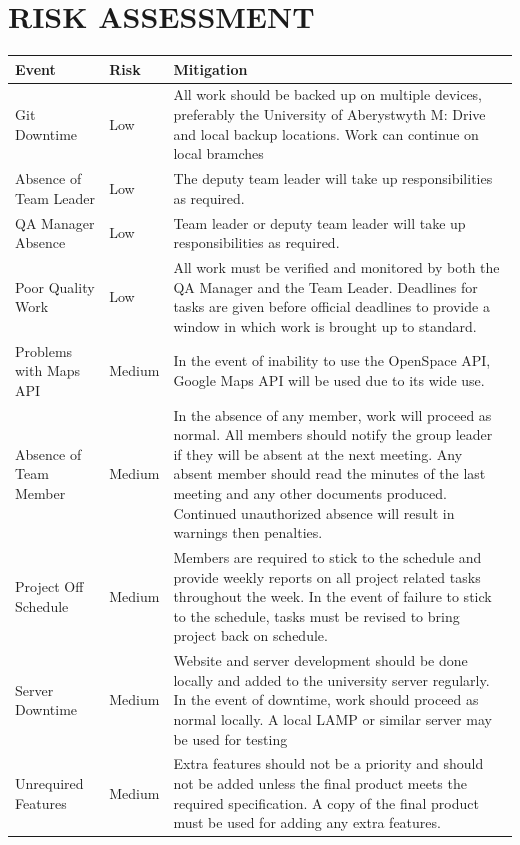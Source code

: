 \documentclass[12pt]{article}
\begin{document}
\section{RISK ASSESSMENT}
\begin{longtable}{|p{2.5cm}|p{1.5cm}|p{10cm}|}
\hline
	Event & Risk & Mitigation\\
\hline
	Git Downtime & Low & All work should be backed up on multiple devices, preferably the University of Aberystwyth M: Drive and local backup locations. Work can continue on local bramches\\
\hline
	Absence of Team Leader & Low & The deputy team leader will take up responsibilities as required.\\
\hline
	QA Manager Absence & Low & Team leader or deputy team leader will take up responsibilities as required. \\
\hline 
	Poor Quality Work & Low & All work must be verified and monitored by both the QA Manager and the Team Leader. Deadlines for tasks are given before official deadlines to provide a window in which work is brought up to standard. \\ 
\hline
	Problems with Maps API & Medium & In the event of inability to use the OpenSpace API, Google Maps API will be used due to its wide use. \\ 
\hline 
	Absence of Team Member & Medium & 
In the absence of any member, work will proceed as normal. All members should notify the group leader if they will be absent at the next meeting. Any absent member should read the minutes of the last meeting and any other documents produced. Continued unauthorized absence will result in warnings then penalties.\\
\hline 
	Project Off Schedule & Medium & Members are required to stick to the schedule and provide weekly reports on all project related tasks throughout the week. In the event of failure to stick to the schedule, tasks must be revised to bring project back on schedule.\\
\hline 
	Server Downtime & Medium & Website and server development should be done locally and added to the university server regularly. In the event of downtime, work should proceed as normal locally. A local LAMP or similar server may be used for testing \\
\hline 
	Unrequired Features & Medium & Extra features should not be a priority and should not be added unless the final product meets the required specification. A copy of the final product must be used for adding any extra features. \\

\end{longtable}
\end{document}
